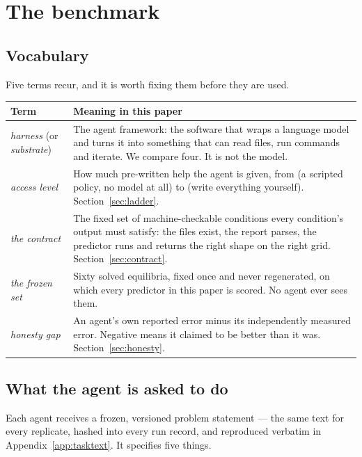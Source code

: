 \section{The benchmark}
\label{sec:benchmark}

\subsection{Vocabulary}
\label{sec:notation}

Five terms recur, and it is worth fixing them before they are used.

\begin{center}
\footnotesize
\begin{tabular}{@{}lp{}@{}}
\toprule
\textbf{Term} & \textbf{Meaning in this paper} \\
\midrule
\emph{harness} (or \emph{substrate})
  & The agent framework: the software that wraps a language model and turns it
    into something that can read files, run commands and iterate. We compare
    four. It is not the model. \\
\emph{access level}
  & How much pre-written help the agent is given, from \Lzero{} (a scripted
    policy, no model at all) to \Lthree{} (write everything yourself).
    Section~\ref{sec:ladder}. \\
\emph{the contract}
  & The fixed set of machine-checkable conditions every condition's output must
    satisfy: the files exist, the report parses, the predictor runs and returns
    the right shape on the right grid. Section~\ref{sec:contract}. \\
\emph{the frozen set}
  & Sixty solved equilibria, fixed once and never regenerated, on which every
    predictor in this paper is scored. No agent ever sees them. \\
\emph{honesty gap}
  & An agent's own reported error minus its independently measured error.
    Negative means it claimed to be better than it was.
    Section~\ref{sec:honesty}. \\
\bottomrule
\end{tabular}
\end{center}

\subsection{What the agent is asked to do}
\label{sec:task}

Each agent receives a frozen, versioned problem statement --- the same text for
every replicate, hashed into every run record, and reproduced verbatim in
Appendix~\ref{app:tasktext}. It specifies five things.

